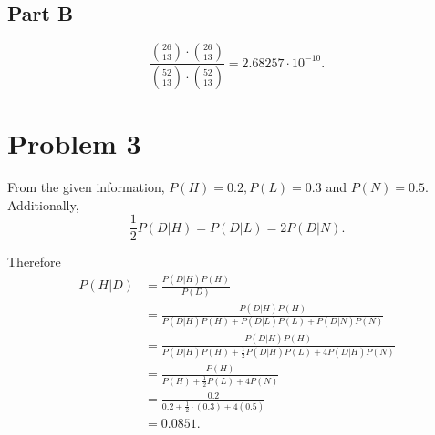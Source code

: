 \documentclass[12pt]{extarticle}
\begin{document}
\subsection*{Part B}
\[
\frac{\binom{26}{13}\cdot\binom{26}{13}}{\binom{52}{13}\cdot\binom{52}{13}} = 2.68257\cdot 10^{-10}
.\]

\section*{Problem 3}
From the given information, $P(H) = 0.2, P(L) = 0.3$ and $P(N) = 0.5$. Additionally,
\[
	\frac{1}{2} P(D | H) = P(D | L) = 2 P(D | N)
.\]

Therefore
\begin{align*}
	P(H | D) &= \frac{P(D|H) P(H)}{P(D)} \\
	&= \frac{P(D|H) P(H)}{P(D | H) P(H) + P(D | L) P(L) + P(D | N) P(N)} \\
	&= \frac{P(D|H) P(H)}{P(D | H) P(H) + \frac{1}{2} P(D | H) P(L) + 4 P(D | H) P(N)} \\
	&= \frac{P(H)}{P(H) + \frac{1}{2} P(L) + 4 P(N)} \\
	&= \frac{0.2}{0.2 + \frac{1}{2} \cdot (0.3) + 4 (0.5)} \\
	&= 0.0851
.\end{align*}
\end{document}
